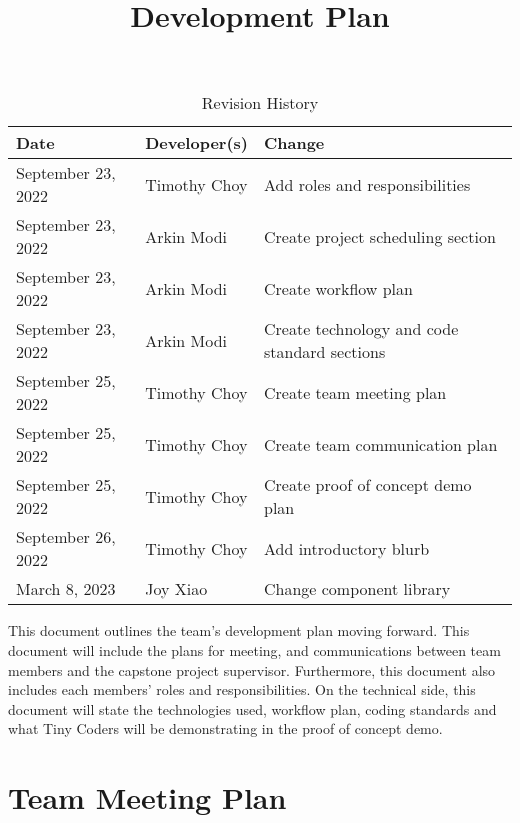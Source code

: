 \documentclass{article}
\title{Development Plan\\\progname}
\author{\authname}
\date{}
\begin{document}
\maketitle

\begin{table}[hp]
	\caption{Revision History} \label{TblRevisionHistory}
	\begin{tabularx}{\textwidth}{llX}
		\toprule
		\textbf{Date}      & \textbf{Developer(s)} & \textbf{Change}                              \\
		\midrule
		September 23, 2022 & Timothy Choy          & Add roles and responsibilities               \\
		September 23, 2022 & Arkin Modi            & Create project scheduling section            \\
		September 23, 2022 & Arkin Modi            & Create workflow plan                         \\
		September 23, 2022 & Arkin Modi            & Create technology and code standard sections \\
		September 25, 2022 & Timothy Choy          & Create team meeting plan                     \\
		September 25, 2022 & Timothy Choy          & Create team communication plan               \\
		September 25, 2022 & Timothy Choy          & Create proof of concept demo plan            \\
		September 26, 2022 & Timothy Choy          & Add introductory blurb                       \\
		March 8, 2023      & Joy Xiao              & Change component library                     \\
		\bottomrule
	\end{tabularx}
\end{table}

This document outlines the team's development plan moving forward. This document will include the
plans for meeting, and communications between team members and the capstone project supervisor.
Furthermore, this document also includes each members' roles and responsibilities. On the technical
side, this document will state the technologies used, workflow plan, coding standards and what Tiny
Coders will be demonstrating in the proof of concept demo.

\section{Team Meeting Plan}
\end{document}

